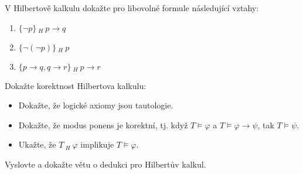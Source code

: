 \documentclass[a4paper,12pt]{article}
\begin{document}
    
    \medskip\begin{problem}
    V Hilbertově kalkulu dokažte pro libovolné formule následující vztahy:
    \begin{enumerate}
        \item $\{\neg p\}\ _H\ p\to q$
        \item $\{\neg(\neg p)\}\ _H\ p$
        \item $\{p\to q,q \to r\}\ _H\ p\to r$
    \end{enumerate}    
    \end{problem}
    
    \medskip\begin{problem}
        Dokažte korektnost Hilbertova kalkulu:
        \begin{itemize}
            \item Dokažte, že logické axiomy jsou tautologie.
            \item Dokažte, že modus ponens je korektní, tj. když $T\models\varphi$ a $T\models\varphi\to\psi$, tak $T\models\psi$.
            \item Ukažte, že $T\ _H\ \varphi$ implikuje $T\models\varphi$.
        \end{itemize}
        \end{problem}
        
    \medskip\begin{problem}
        Vyslovte a dokažte větu o dedukci pro Hilbertův kalkul.
    \end{problem}
       
\end{document}
